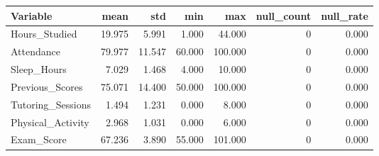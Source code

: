 \begin{tabular}{lrrrrrr}
\toprule
Variable & mean & std & min & max & null_count & null_rate \\
\midrule
Hours_Studied & 19.975 & 5.991 & 1.000 & 44.000 & 0 & 0.000 \\
Attendance & 79.977 & 11.547 & 60.000 & 100.000 & 0 & 0.000 \\
Sleep_Hours & 7.029 & 1.468 & 4.000 & 10.000 & 0 & 0.000 \\
Previous_Scores & 75.071 & 14.400 & 50.000 & 100.000 & 0 & 0.000 \\
Tutoring_Sessions & 1.494 & 1.231 & 0.000 & 8.000 & 0 & 0.000 \\
Physical_Activity & 2.968 & 1.031 & 0.000 & 6.000 & 0 & 0.000 \\
Exam_Score & 67.236 & 3.890 & 55.000 & 101.000 & 0 & 0.000 \\
\bottomrule
\end{tabular}

